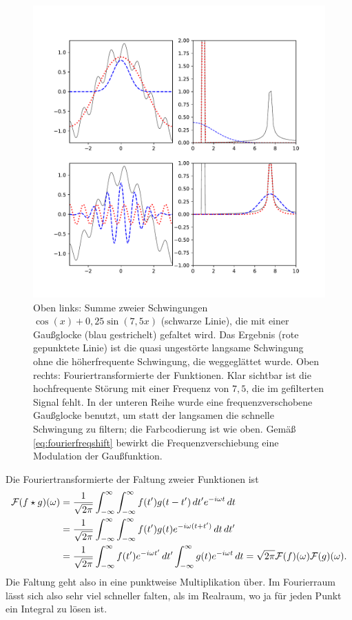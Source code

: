 \begin{figure}
  \centering
  \includegraphics[width=\textwidth]{plots/fouriertrafo}
  \caption{Oben links: Summe zweier Schwingungen $\cos(x) +
    0,25\sin(7,5 x)$ (schwarze Linie), die mit einer Gaußglocke (blau
    gestrichelt) gefaltet wird. Das Ergebnis (rote gepunktete Linie)
    ist die quasi ungestörte langsame Schwingung ohne die
    höherfrequente Schwingung, die weggeglättet wurde. Oben rechts:
    Fouriertransformierte der Funktionen. Klar sichtbar ist die
    hochfrequente Störung mit einer Frequenz von $7,5$, die im
    gefilterten Signal fehlt. In der unteren Reihe wurde eine
    frequenzverschobene Gaußglocke benutzt, um statt der langsamen die
    schnelle Schwingung zu filtern; die Farbcodierung ist wie
    oben. Gemäß \eqref{eq:fourierfreqshift} bewirkt die
    Frequenzverschiebung eine Modulation der Gaußfunktion.}
  \label{fig:fourierfaltung}
\end{figure}

Die Fouriertransformierte der Faltung zweier Funktionen ist
\begin{equation}
  \label{eq:fourierfaltung}
  \begin{split}
    \mathcal F(f\star g)(\omega) &=
    \frac{1}{\sqrt{2\pi}}\int_{-\infty}^{\infty}
    \int_{-\infty}^{\infty} f(t')g(t-t')\,dt' e^{-i \omega t}\,
    dt\\
    &= \frac{1}{\sqrt{2\pi}}\int_{-\infty}^{\infty}
    \int_{-\infty}^{\infty} f(t') g(t) e^{-i \omega (t+t')}\, dt\,
    dt'\\
    &= \frac{1}{\sqrt{2\pi}} \int_{-\infty}^{\infty} f(t')e^{-i
      \omega t'}\, dt' \int_{-\infty}^{\infty} g(t) e^{-i \omega
      t}\, dt = \sqrt{2\pi}\mathcal F(f)(\omega)\mathcal F(g)(\omega).
  \end{split}
\end{equation}
Die Faltung geht also in eine punktweise Multiplikation über. Im
Fourierraum lässt sich also sehr viel schneller falten, als im
Realraum, wo ja für jeden Punkt ein Integral zu lösen ist.

